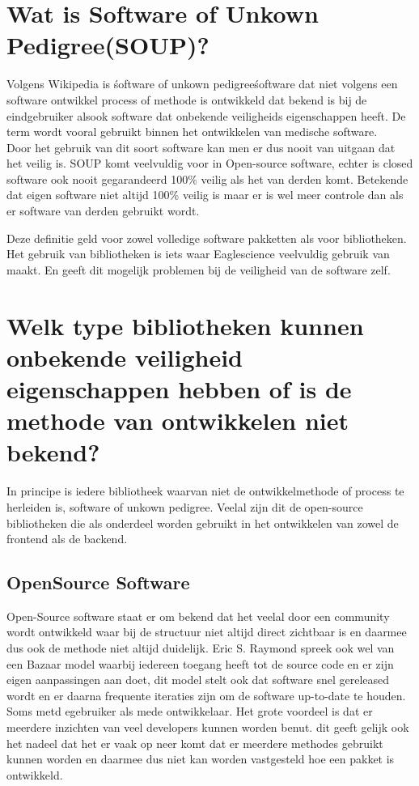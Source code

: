 \section{Wat is Software of Unkown Pedigree(SOUP)?}
Volgens Wikipedia is \'software of unkown pedigree\' software dat niet volgens een software ontwikkel process of methode is ontwikkeld dat bekend is bij de eindgebruiker alsook software dat onbekende veiligheids eigenschappen heeft. De term wordt vooral gebruikt binnen het ontwikkelen van medische software.\\  %
Door het gebruik van dit soort software kan men er dus nooit van uitgaan dat het veilig is.  SOUP komt veelvuldig voor in Open-source software, echter is closed software ook nooit gegarandeerd 100\% veilig als het van derden komt. Betekende dat eigen software niet altijd 100\% veilig is maar er is wel meer controle dan als er software van derden gebruikt wordt.

Deze definitie geld voor zowel volledige software pakketten als voor bibliotheken. Het gebruik van bibliotheken is iets waar Eaglescience veelvuldig gebruik van maakt. En geeft dit mogelijk problemen bij de veiligheid van de software zelf.

\section{Welk type bibliotheken kunnen onbekende veiligheid eigenschappen hebben of is de methode van ontwikkelen niet bekend?}
In principe is iedere bibliotheek waarvan niet de ontwikkelmethode of process te herleiden is, software of unkown pedigree. Veelal zijn dit de open-source bibliotheken die als onderdeel worden gebruikt in het ontwikkelen van zowel de frontend als de backend.

\subsection{OpenSource Software}Open-Source software staat er om bekend dat het veelal door een community wordt ontwikkeld waar bij de structuur niet altijd direct zichtbaar is en daarmee dus ook de methode niet altijd duidelijk.  	Eric S. Raymond spreek ook wel van een Bazaar model %
waarbij iedereen toegang heeft tot de source code en er zijn eigen aanpassingen aan doet, dit model stelt ook dat software snel gereleased wordt en er daarna frequente iteraties zijn om de software up-to-date te houden. Soms metd egebruiker als mede ontwikkelaar. Het grote voordeel is dat er meerdere inzichten van veel developers kunnen worden benut. dit geeft gelijk ook het nadeel dat het er vaak op neer komt dat er meerdere methodes gebruikt kunnen worden en daarmee dus niet kan worden vastgesteld hoe een pakket is ontwikkeld.


